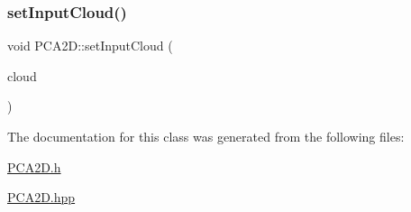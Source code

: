 \subsubsection{\texorpdfstring{set\+Input\+Cloud()}{setInputCloud()}\hspace{0.1cm}{\footnotesize\ttfamily [2/2]}}
{\footnotesize\ttfamily void P\+C\+A2\+D\+::set\+Input\+Cloud (\begin{DoxyParamCaption}\item[{const \hyperlink{Normal2dEstimation_8h_a389a43addc496dc19a5bb0575cc60bc4}{Const\+Ptr\+Cloud} \&}]{cloud }\end{DoxyParamCaption})\hspace{0.3cm}{\ttfamily [inline]}}



The documentation for this class was generated from the following files\+:\begin{DoxyCompactItemize}
\item 
\hyperlink{PCA2D_8h}{P\+C\+A2\+D.\+h}\item 
\hyperlink{PCA2D_8hpp}{P\+C\+A2\+D.\+hpp}\end{DoxyCompactItemize}
